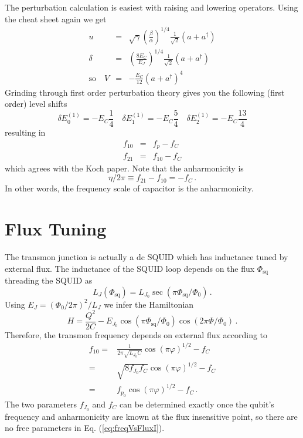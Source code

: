 \documentclass[twocolumn]{article}
\begin{document}
The perturbation calculation is easiest with raising and lowering operators.
Using the cheat sheet again we get \begin{eqnarray}
u &=& \sqrt{\gamma} \left( \frac{\beta}{\alpha} \right) ^{1/4} \frac{1}{\sqrt{2}} (a + a^{\dagger}) \\
\delta &=& \left( \frac{8E_C}{E_J} \right) ^{1/4} \frac{1}{\sqrt{2}} (a + a^{\dagger}) \\
\textrm{so} \quad V &=& -\frac{E_C}{12} (a + a^{\dagger})^4 \end{eqnarray}
Grinding through first order perturbation theory gives you the following (first order) level shifts \begin{equation}
\delta E_0^{(1)} = -E_C \frac{1}{4} \quad \delta E_1^{(1)} = -E_C \frac{5}{4} \quad \delta E_2^{(1)} = -E_C \frac{13}{4}\end{equation}
resulting in \begin{eqnarray}
f_{10} &=& f_p - f_C \\
f_{21} &=& f_{10} - f_C \end{eqnarray}
which agrees with the Koch paper.
Note that the anharmonicity is
\begin{equation}
\eta/2\pi \equiv f_{21} - f_{10} = -f_C \, .
\end{equation}
In other words, the frequency scale of capacitor is the anharmonicity.

\section{Flux Tuning}
The transmon junction is actually a dc SQUID which has inductance tuned by external flux.
The inductance of the SQUID loop depends on the flux $\Phi_\text{sq}$ threading the SQUID as
\begin{equation}
L_J(\Phi_\text{sq}) = L_{J_0} \sec \left( \pi \Phi_\text{sq} / \Phi_0 \right) \, .
\end{equation}
Using $E_J = (\Phi_0/2\pi)^2 / L_J$ we infer the Hamiltonian
\begin{equation}
H = \frac{Q^2}{2C} - E_{J_0} \cos(\pi \Phi_\text{sq} / \Phi_0) \cos(2\pi \Phi / \Phi_0) \, .
\end{equation}
Therefore, the transmon frequency depends on external flux according to
\begin{align}
f_{10}
= & \frac{1}{2 \pi \sqrt{L_{J_0} C}} \cos \left( \pi \varphi \right)^{1/2} - f_C \\
= & \sqrt{8 f_{J_0} f_C} \cos \left( \pi \varphi \right)^{1/2} - f_C \\
= & f_{p_0} \cos \left( \pi \varphi \right)^{1/2} - f_C \, .
 \label{eq:freqVsFluxI}
\end{align}
The two parameters $f_{J_0}$ and $f_C$ can be determined exactly once the qubit's frequency and anharmonicity are known at the flux insensitive point, so there are no free parameters in Eq. (\ref{eq:freqVsFluxI}).
\end{document}
